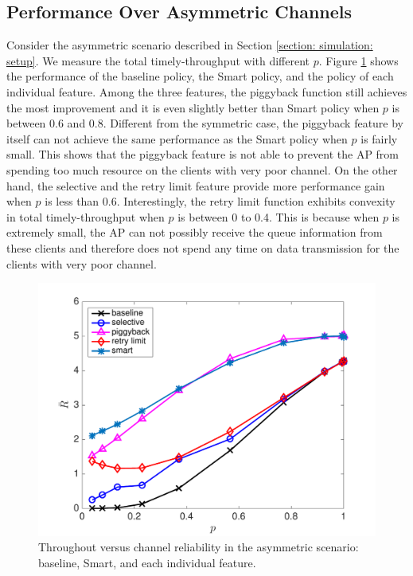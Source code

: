 \documentclass{article}
\begin{document}
\subsection{Performance Over Asymmetric Channels}
Consider the asymmetric scenario described in Section \ref{section: simulation: setup}. We measure the total timely-throughput with different $p$.  Figure \ref{sim: asym: three features} shows the performance of the baseline policy, the Smart policy, and the policy of each individual feature. Among the three features, the piggyback function still achieves the most improvement and it is even slightly better than Smart policy when $p$ is between 0.6 and 0.8. Different from the symmetric case, the piggyback feature by itself can not achieve the same performance as the Smart policy when $p$ is fairly small. This shows that the piggyback feature is not able to prevent the AP from spending too much resource on the clients with very poor channel. On the other hand, the selective and the retry limit feature provide more performance gain when $p$ is less than 0.6. Interestingly, the retry limit function exhibits convexity in total timely-throughput when $p$ is between 0 to 0.4. This is because when $p$ is extremely small, the AP can not possibly receive the queue information from these clients and therefore does not spend any time on data transmission for the clients with very poor channel.

\begin{figure}[htbp]
\centering
\includegraphics[scale=0.5]{3policycompare_asym.pdf}
\caption{Throughout versus channel reliability in the asymmetric scenario: baseline, Smart, and each individual feature.}
\label{sim: asym: three features}
\end{figure}
\end{document}
